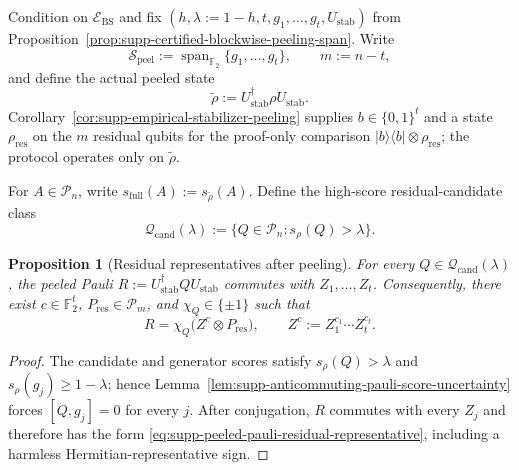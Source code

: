 \documentclass[
  aps,
  prx,
  reprint,
  superscriptaddress,
  amsmath,
  amssymb,
  nofootinbib,
  longbibliography
]{revtex4-2}
\newtheorem{proposition}[theorem]{Proposition}
\newcommand{\Span}{\operatorname{span}}
\newcommand{\Pc}{\mathcal{P}}
\newcommand{\Fc}{\mathbb{F}_2}
\begin{document}
Condition on $\mathcal E_{\mathrm{BS}}$ and fix
$(h,\lambda:=1-h,t,g_1,\dots,g_t,U_{\mathrm{stab}})$ from
Proposition~\ref{prop:supp-certified-blockwise-peeling-span}.  Write
\begin{equation}
\mathcal S_{\mathrm{peel}}
:=
\Span_{\Fc}\{g_1,\dots,g_t\},
\qquad
m:=n-t,
\label{eq:supp-residual-qubit-number}
\end{equation}
and define the actual peeled state
\begin{equation}
\tilde\rho
:=
U_{\mathrm{stab}}^\dagger\rho U_{\mathrm{stab}}.
\label{eq:supp-recovery-peeled-state}
\end{equation}
Corollary~\ref{cor:supp-empirical-stabilizer-peeling} supplies
$b\in\{0,1\}^t$ and a state $\rho_{\mathrm{res}}$ on the $m$ residual
qubits for the proof-only comparison
$|b\rangle\!\langle b|\otimes\rho_{\mathrm{res}}$; the protocol operates
only on $\tilde\rho$.

For $A\in\Pc_n$, write
$s_{\mathrm{full}}(A):=s_{\tilde\rho}(A)$.
Define the high-score residual-candidate class
\begin{equation}
\mathcal Q_{\mathrm{cand}}(\lambda)
:=
\{Q\in\Pc_n:s_\rho(Q)>\lambda\}.
\label{eq:supp-high-score-residual-candidate-class}
\end{equation}

\begin{proposition}[Residual representatives after peeling]
\label{prop:supp-residual-representatives-after-peeling}
For every $Q\in\mathcal Q_{\mathrm{cand}}(\lambda)$, the peeled Pauli
$R:=U_{\mathrm{stab}}^\dagger Q U_{\mathrm{stab}}$ commutes with
$Z_1,\dots,Z_t$.  Consequently, there exist
$c\in\Fc^t$, $P_{\mathrm{res}}\in\Pc_m$, and
$\chi_Q\in\{\pm1\}$ such that
\begin{equation}
R=
\chi_Q\bigl(
Z^c\otimes P_{\mathrm{res}}
\bigr),
\qquad
Z^c:=Z_1^{c_1}\cdots Z_t^{c_t}.
\label{eq:supp-peeled-pauli-residual-representative}
\end{equation}
\end{proposition}

\begin{proof}
The candidate and generator scores satisfy
$s_\rho(Q)>\lambda$ and $s_\rho(g_j)\ge1-\lambda$; hence
Lemma~\ref{lem:supp-anticommuting-pauli-score-uncertainty} forces
$[Q,g_j]=0$ for every $j$.  After conjugation, $R$ commutes with every
$Z_j$ and therefore has the form
\eqref{eq:supp-peeled-pauli-residual-representative}, including a harmless
Hermitian-representative sign.
\end{proof}
\end{document}
